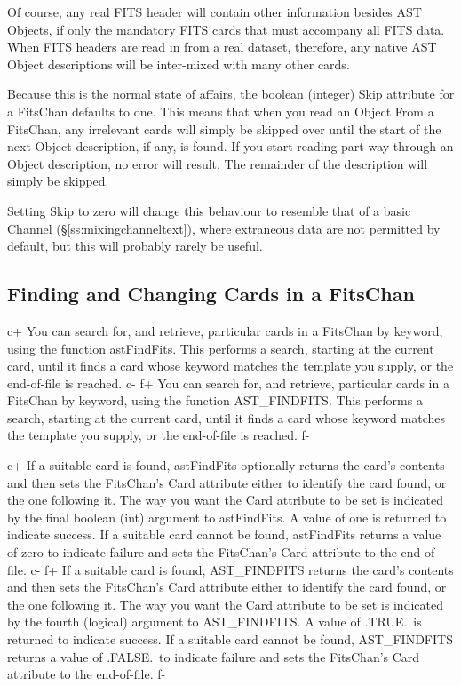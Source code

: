 \documentclass[twoside,11pt]{starlink}
\providecommand{\secref}[1]{\S\ref{#1}}
\begin{document}
Of course, any real FITS header will contain other information besides
AST Objects, if only the mandatory FITS cards that must accompany all
FITS data. When FITS headers are read in from a real dataset,
therefore, any native AST Object descriptions will be inter-mixed with
many other cards.

Because this is the normal state of affairs, the boolean (integer)
Skip attribute for a FitsChan defaults to one. This means that when
you read an Object From a FitsChan, any irrelevant cards will simply
be skipped over until the start of the next Object description, if
any, is found. If you start reading part way through an Object
description, no error will result. The remainder of the description
will simply be skipped.

Setting Skip to zero will change this behaviour to resemble that of a
basic Channel (\secref{ss:mixingchanneltext}), where extraneous data
are not permitted by default, but this will probably rarely be useful.

\subsection{\label{ss:findingandchangingfits}Finding and Changing Cards in a FitsChan}

c+
You can search for, and retrieve, particular cards in a FitsChan by
keyword, using the function astFindFits. This performs a search,
starting at the current card, until it finds a card whose keyword
matches the template you supply, or the end-of-file is reached.
c-
f+
You can search for, and retrieve, particular cards in a FitsChan by
keyword, using the function AST\_FINDFITS. This performs a search,
starting at the current card, until it finds a card whose keyword
matches the template you supply, or the end-of-file is reached.
f-

c+
If a suitable card is found, astFindFits optionally returns the card's
contents and then sets the FitsChan's Card attribute either to
identify the card found, or the one following it. The way you want the
Card attribute to be set is indicated by the final boolean (int)
argument to astFindFits. A value of one is returned to indicate
success.  If a suitable card cannot be found, astFindFits returns a
value of zero to indicate failure and sets the FitsChan's Card
attribute to the end-of-file.
c-
f+
If a suitable card is found, AST\_FINDFITS returns the card's contents
and then sets the FitsChan's Card attribute either to identify the
card found, or the one following it. The way you want the Card
attribute to be set is indicated by the fourth (logical) argument to
AST\_FINDFITS. A value of .TRUE.\ is returned to indicate success.  If
a suitable card cannot be found, AST\_FINDFITS returns a value of
.FALSE.\ to indicate failure and sets the FitsChan's Card attribute to
the end-of-file.
f-
\end{document}
